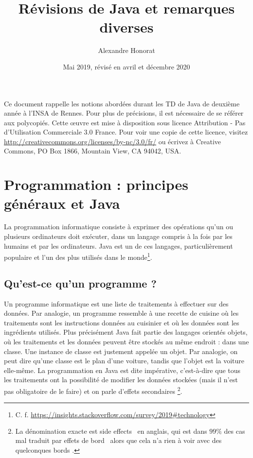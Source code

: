 \documentclass[10pt]{article}
\title{Révisions de Java et remarques diverses}
\author{Alexandre Honorat}
\date{Mai 2019, révisé en avril et décembre 2020}
\begin{document}
\maketitle

Ce document rappelle les notions abordées durant les TD de Java de deuxième année
à l'INSA de Rennes. Pour plus de précisions, il est nécessaire de se référer aux polycopiés.
Cette œuvre est mise à disposition sous licence
Attribution - Pas d’Utilisation Commerciale 3.0 France.
Pour voir une copie de cette licence, visitez \url{http://creativecommons.org/licenses/by-nc/3.0/fr/}
ou écrivez à Creative Commons, PO Box 1866, Mountain View, CA 94042, USA.

\section{Programmation : principes généraux et Java}


La programmation informatique consiste à exprimer des opérations
qu'un ou plusieurs ordinateurs doit exécuter, dans un langage compris
à la fois par les humains et par les ordinateurs. Java est un de ces langages,
particulièrement populaire et l'un des plus utilisés dans le monde\footnote{C. f. \url{https://insights.stackoverflow.com/survey/2019\#technology}}.


\subsection{Qu'est-ce qu'un programme ?}

Un programme informatique est une liste de traitements à effectuer sur des données. Par analogie, un programme
ressemble à une recette de cuisine où les traitements sont les instructions données au cuisinier
et où les données sont les ingrédients utilisés. Plus précisément Java fait partie des langages
orientés objets, où les traitements et les données peuvent être stockés au même endroit : dans une
classe. Une instance de classe est justement appelée un objet. Par analogie, on peut dire qu'une classe
est le plan d'une voiture, tandis que l'objet est la voiture elle-même.
La programmation en Java est dite impérative, c'est-à-dire que tous les traitements
ont la possibilité de modifier les données stockées (mais il n'est pas obligatoire de le faire) et on parle
d'effets secondaires \footnote{La dénomination exacte est \og side effects \fg~en anglais, qui est dans $99\%$
des cas mal traduit par \og effets de bord \fg~alors que cela n'a rien à voir avec des quelconques \og bords \fg.}.
\end{document}
